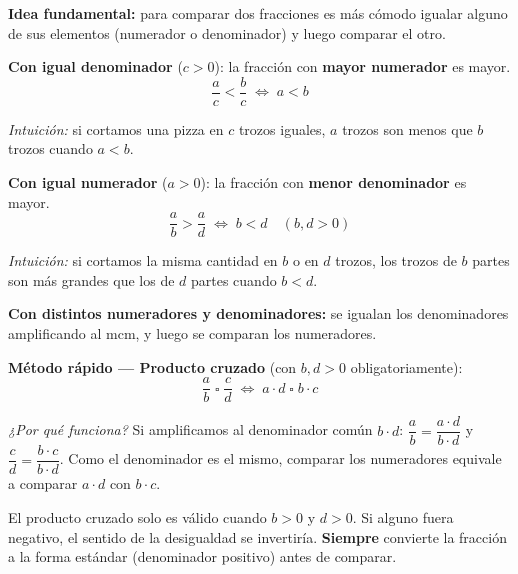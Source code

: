 \documentclass[11pt, letterpaper]{article}
\begin{document}
\begin{tcolorbox}[importantbox, title={Comparaci\'on de fracciones}]
\noindent\textbf{Idea fundamental:} para comparar dos fracciones es m\'as c\'omodo igualar alguno de sus elementos (numerador o denominador) y luego comparar el otro.

\medskip

\noindent\textbf{Con igual denominador} ($c > 0$): la fracci\'on con \textbf{mayor numerador} es mayor.
$$\frac{a}{c} < \frac{b}{c} \;\Longleftrightarrow\; a < b$$

\noindent\textit{Intuici\'on:} si cortamos una pizza en $c$ trozos iguales, $a$ trozos son menos que $b$ trozos cuando $a<b$.

\medskip

\noindent\textbf{Con igual numerador} ($a > 0$): la fracci\'on con \textbf{menor denominador} es mayor.
$$\frac{a}{b} > \frac{a}{d} \;\Longleftrightarrow\; b < d \quad (b,d>0)$$

\noindent\textit{Intuici\'on:} si cortamos la misma cantidad en $b$ o en $d$ trozos, los trozos de $b$ partes son m\'as grandes que los de $d$ partes cuando $b<d$.

\medskip

\noindent\textbf{Con distintos numeradores y denominadores:} se igualan los denominadores amplificando al $\text{mcm}$, y luego se comparan los numeradores.

\medskip

\noindent\textbf{M\'etodo r\'apido --- Producto cruzado} (con $b,d > 0$ obligatoriamente):
$$\frac{a}{b} \;\square\; \frac{c}{d} \;\Longleftrightarrow\; a \cdot d \;\square\; b \cdot c$$

\noindent\textit{¿Por qu\'e funciona?} Si amplificamos al denominador com\'un $b\cdot d$: $\dfrac{a}{b}=\dfrac{a\cdot d}{b\cdot d}$ y $\dfrac{c}{d}=\dfrac{b\cdot c}{b\cdot d}$. Como el denominador es el mismo, comparar los numeradores equivale a comparar $a\cdot d$ con $b\cdot c$.

\medskip
\begin{tcolorbox}[warningbox, title={¡Atenci\'on con los denominadores negativos!}]
El producto cruzado solo es v\'alido cuando $b>0$ y $d>0$. Si alguno fuera negativo, el sentido de la desigualdad se invertir\'ia. \textbf{Siempre} convierte la fracci\'on a la forma est\'andar (denominador positivo) antes de comparar.
\end{tcolorbox}
\end{tcolorbox}
\end{document}
